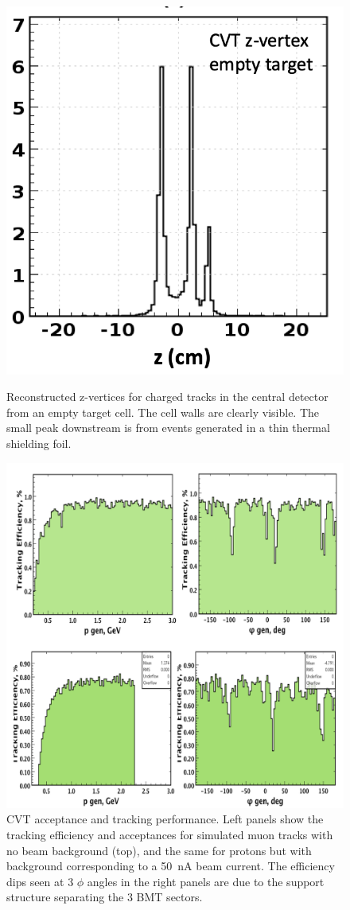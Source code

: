 \documentclass[final,3p,twocolumn]{elsarticle}
\begin{document}
\begin{figure}[t!]
\centerline{\includegraphics[width=0.8\columnwidth]{cvt-vertex.png}}
\caption{Reconstructed z-vertices for charged tracks in the central detector from an empty target cell. The cell walls are 
clearly visible. The small peak downstream is from events generated in a thin thermal shielding foil.  }
\label{cvt-vertex}
\centerline{\includegraphics[width=1.0\columnwidth]{cvt-acceptance.png}}
\caption{CVT acceptance and tracking performance. Left panels show the tracking efficiency and acceptances for 
simulated muon tracks with no beam background (top), and the same for protons but with background corresponding
to a 50~nA beam current. The efficiency dips seen at 3 $\phi$ angles in the right panels are due to the support 
structure separating the 3 BMT sectors.}
\label{cvt-acceptance}
\end{figure}
\end{document}
